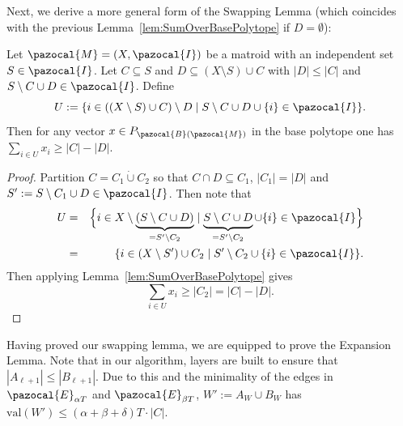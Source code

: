 Next, we derive a more general form of the Swapping Lemma (which coincides
with the previous Lemma~\ref{lem:SumOverBasePolytope} if $D = \emptyset$): 
\begin{lemma} \label{lem:SumOverBasePolytopeGeneral}
Let $\pazocal{M} = (X,\pazocal{I})$ be a matroid with an independent set $S \in \pazocal{I}$.
Let $C \subseteq S$ and $D \subseteq (X \setminus S) \cup C$ with $|D| \leq |C|$ and $S \setminus C \cup D \in \pazocal{I}$. Define
\[
    U := \{ i \in ((X \setminus S) \cup C) \setminus D \mid S \setminus C \cup D \cup \{i\} \in \pazocal{I}\}.
\]
Then for any vector $x \in P_{\pazocal{B}(\pazocal{M})}$ in the base polytope one has $\sum_{i \in U} x_i \geq |C| - |D|$.
\end{lemma}
\begin{proof}
Partition $C = C_1 \dot{\cup} C_2$ so that $C \cap D \subseteq C_1$, $|C_1| = |D|$ and
$S' := S \setminus C_1 \cup D \in \pazocal{I}$. %
Then note that
\begin{eqnarray*}
    U &=& \Big\{ i \in X \setminus \underbrace{(S \setminus C \cup D)}_{=S' \setminus C_2} 
    \mid \underbrace{S \setminus C \cup D}_{=S' \setminus C_2} \cup \{ i\} \in \pazocal{I} \Big\} \\
&=& \{ i \in (X \setminus S') \cup C_2 \mid S' \setminus C_2 \cup \{ i\} \in \pazocal{I}\}.
\end{eqnarray*}
Then applying Lemma~\ref{lem:SumOverBasePolytope} gives
\[
    \sum_{i \in U} x_i \geq |C_2| = |C| - |D|.
\]
\end{proof}
  

Having proved our swapping lemma, we are equipped to prove the Expansion Lemma. 
Note that in our algorithm, layers are built to ensure that $|A_{\ell +1}| \leq |B_{\ell +1}|$. 
Due to this and the minimality of the edges in $\pazocal{E}_{\alpha T}$ and $\pazocal{E}_{\beta T}$,
$W' := A_W \cup B_W$ has $\text{val}(W') \leq (\alpha+\beta + \delta) T \cdot |C|$. 

